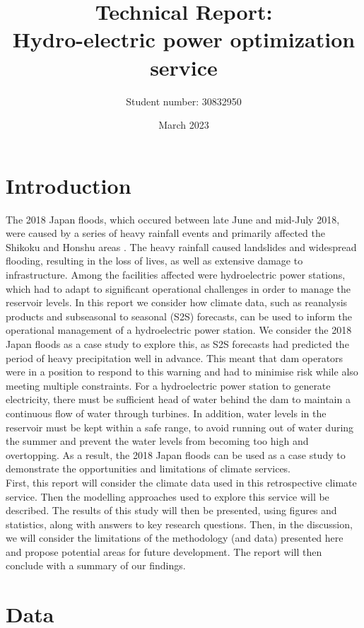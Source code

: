 \documentclass[11pt]{article}
\title{Technical Report: \\
\large Hydro-electric power optimization service}
\author{Student number: 30832950}
\date{March 2023}
\begin{document}
\maketitle

\section*{Introduction}

The 2018 Japan floods, which occured between late June and mid-July 2018, were caused by a series of heavy rainfall events and primarily affected the Shikoku and Honshu areas \parencite{wiki:2018_Japan_floods}. The heavy rainfall caused landslides and widespread flooding, resulting in the loss of lives, as well as extensive damage to infrastructure. Among the facilities affected were hydroelectric power stations, which had to adapt to significant operational challenges in order to manage the reservoir levels. In this report we consider how climate data, such as reanalysis products and subseasonal to seasonal (S2S) forecasts, can be used to inform the operational management of a hydroelectric power station. We consider the 2018 Japan floods as a case study to explore this, as S2S forecasts had predicted the period of heavy precipitation well in advance. This meant that dam operators were in a position to respond to this warning and had to minimise risk while also meeting multiple constraints. For a hydroelectric power station to generate electricity, there must be sufficient head of water behind the dam to maintain a continuous flow of water through turbines. In addition, water levels in the reservoir must be kept within a safe range, to avoid running out of water during the summer and prevent the water levels from becoming too high and overtopping. As a result, the 2018 Japan floods can be used as a case study to demonstrate the opportunities and limitations of climate services.\\

First, this report will consider the climate data used in this retrospective climate service. Then the modelling approaches used to explore this service will be described. The results of this study will then be presented, using figures and statistics, along with answers to key research questions. Then, in the discussion, we will consider the limitations of the methodology (and data) presented here and propose potential areas for future development. The report will then conclude with a summary of our findings. 

\section*{Data}
\end{document}
